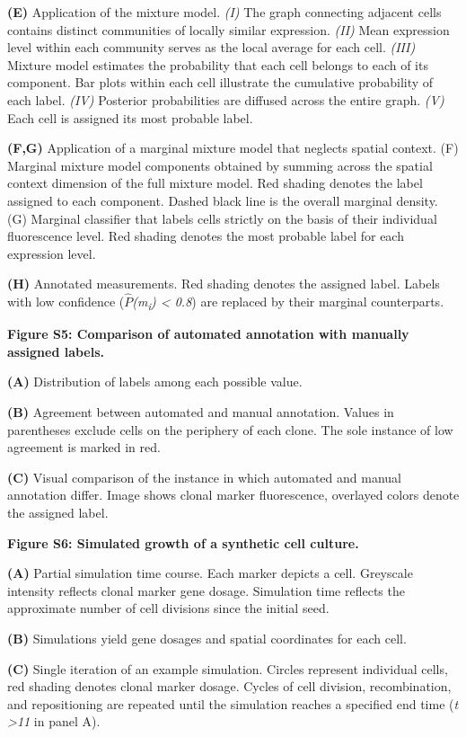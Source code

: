 \textbf{(E)} Application of the mixture model. \emph{(I)} The graph connecting adjacent cells contains distinct communities of locally similar expression. \emph{(II)} Mean expression level within each community serves as the local average for each cell. \emph{(III)} Mixture model estimates the probability that each cell belongs to each of its component. Bar plots within each cell illustrate the cumulative probability of each label. \emph{(IV)} Posterior probabilities are diffused across the entire graph. \emph{(V)} Each cell is assigned its most probable label.

\textbf{(F,G)} Application of a marginal mixture model that neglects spatial context. (F) Marginal mixture model components obtained by summing across the spatial context dimension of the full mixture model. Red shading denotes the label assigned to each component. Dashed black line is the overall marginal density. (G) Marginal classifier that labels cells strictly on the basis of their individual fluorescence level. Red shading denotes the most probable label for each expression level.

\textbf{(H)} Annotated measurements. Red shading denotes the assigned label. Labels with low confidence (\(\widehat{P}\)\emph{(m\textsubscript{i}) \textless{} 0.8}) are replaced by their marginal counterparts.

\textbf{Figure S5: Comparison of automated annotation with manually assigned labels.}

\textbf{(A)} Distribution of labels among each possible value.

\textbf{(B)} Agreement between automated and manual annotation. Values in parentheses exclude cells on the periphery of each clone. The sole instance of low agreement is marked in red.

\textbf{(C)} Visual comparison of the instance in which automated and manual annotation differ. Image shows clonal marker fluorescence, overlayed colors denote the assigned label.

\textbf{Figure S6: Simulated growth of a synthetic cell culture.}

\textbf{(A)} Partial simulation time course. Each marker depicts a cell. Greyscale intensity reflects clonal marker gene dosage. Simulation time reflects the approximate number of cell divisions since the initial seed.

\textbf{(B)} Simulations yield gene dosages and spatial coordinates for each cell.

\textbf{(C)} Single iteration of an example simulation. Circles represent individual cells, red shading denotes clonal marker dosage. Cycles of cell division, recombination, and repositioning are repeated until the simulation reaches a specified end time (\emph{t \textgreater{}11} in panel A).

